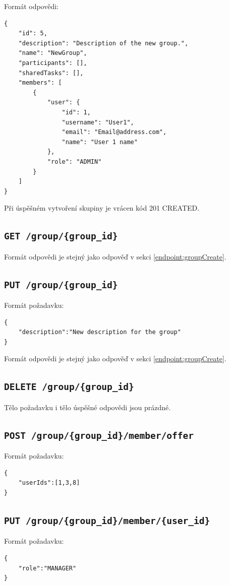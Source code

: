 \documentclass[thesis=B,czech]{FITthesis}[2012/06/26]
\begin{document}
		\noindent
		Formát odpovědi:
		\begin{Verbatim}[obeytabs,tabsize=2]
{
	"id": 5,
	"description": "Description of the new group.",
	"name": "NewGroup",
	"participants": [],
	"sharedTasks": [],
	"members": [
		{
			"user": {
				"id": 1,
				"username": "User1",
				"email": "Email@address.com",
				"name": "User 1 name"
			},
			"role": "ADMIN"
		}
	]
}
		\end{Verbatim}
		
		Při úspěšném vytvoření skupiny je vrácen kód 201 CREATED.
		
		\subsection{\texttt{GET /group/\{group\_id\}}}
		Formát odpovědi je stejný jako odpověď v sekci \ref{endpoint:groupCreate}.
		
		\subsection{\texttt{PUT /group/\{group\_id\}}}
		Formát požadavku:
		\begin{Verbatim}[obeytabs,tabsize=2]
{
	"description":"New description for the group"
}		
		\end{Verbatim}
		
		\noindent
		Formát odpovědi je stejný jako odpověď v sekci \ref{endpoint:groupCreate}.
		
		
		\subsection{\texttt{DELETE /group/\{group\_id\}}}
		Tělo požadavku i tělo úspěšné odpovědi jsou prázdné.
		
		
		\subsection{\texttt{POST /group/\{group\_id\}/member/offer}}
			Formát požadavku:
		\begin{Verbatim}[obeytabs,tabsize=2]			
{
	"userIds":[1,3,8]
}
		\end{Verbatim}
		
		\subsection{\texttt{PUT /group/\{group\_id\}/member/\{user\_id\}}}
			Formát požadavku:
			\begin{Verbatim}
{
	"role":"MANAGER"
}
			\end{Verbatim}
			
\end{document}
